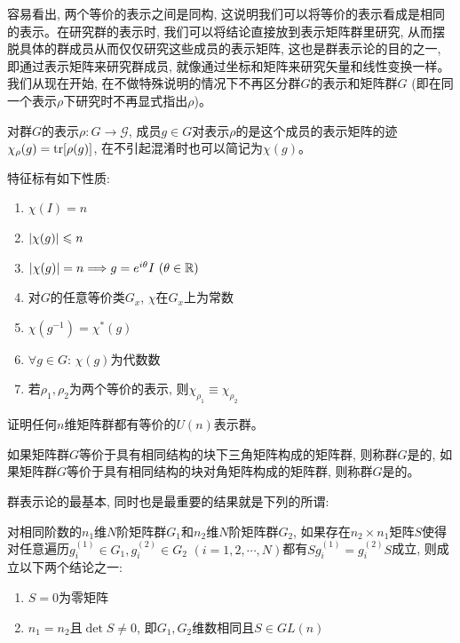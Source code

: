 \par 容易看出, 两个等价的表示之间是同构, 这说明我们可以将等价的表示看成是相同的表示。在研究群的表示时, 我们可以将结论直接放到表示矩阵群里研究, 从而摆脱具体的群成员从而仅仅研究这些成员的表示矩阵, 这也是群表示论的目的之一, 即通过表示矩阵来研究群成员, 就像通过坐标和矩阵来研究矢量和线性变换一样。我们从现在开始, 在不做特殊说明的情况下不再区分群$G$的表示和矩阵群$G$ (即在同一个表示$\rho$下研究时不再显式指出$\rho$)。
\begin{definition}[特征标]
    对群$G$的表示$\rho:G\to\mathcal{G}$, 成员$g\in G$对表示$\rho$的是这个成员的表示矩阵的迹$\chi_\rho(g)=\tr[\rho(g)]$, 在不引起混淆时也可以简记为$\chi(g)$。
\end{definition}
\begin{exercise}[教材B.11]
    特征标有如下性质:
    \begin{enumerate}
        \item $\chi(I)=n$
        \item $\qty|\chi(g)|\leqslant n$
        \item $\qty|\chi(g)|=n\Longrightarrow g=e^{i\theta}I\ (\theta\in\mathbb{R})$
        \item 对$G$的任意等价类$G_x$, $\chi$在$G_x$上为常数
        \item $\chi(g^{-1})=\chi^*(g)$
        \item $\forall g\in G$: $\chi(g)$为代数数
        \item 若$\rho_1,\rho_2$为两个等价的表示, 则$\chi_{\rho_1}\equiv\chi_{\rho_2}$
    \end{enumerate}
\end{exercise}
\begin{exercise}[教材B.12]
    证明任何$n$维矩阵群都有等价的$U(n)$表示群。
\end{exercise}
\begin{definition}
    如果矩阵群$G$等价于具有相同结构的块下三角矩阵构成的矩阵群, 则称群$G$是的, 如果矩阵群$G$等价于具有相同结构的块对角矩阵构成的矩阵群, 则称群$G$是的。
\end{definition}
\par 群表示论的最基本, 同时也是最重要的结果就是下列的所谓:
\begin{theorem}[Schur引理]
    对相同阶数的$n_1$维$N$阶矩阵群$G_1$和$n_2$维$N$阶矩阵群$G_2$, 如果存在$n_2\times n_1$矩阵$S$使得对任意遍历$g^{(1)}_i\in G_1,g^{(2)}_i\in G_2$ $(i=1,2,\cdots, N)$都有$Sg^{(1)}_i=g^{(2)}_iS$成立, 则成立以下两个结论之一:
    \begin{enumerate}
        \item $S=0$为零矩阵
        \item $n_1=n_2$且$\det S\neq 0$, 即$G_1,G_2$维数相同且$S\in GL(n)$
    \end{enumerate}
\end{theorem}
